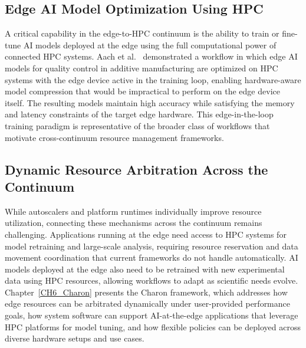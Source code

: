 \subsection{Edge AI Model Optimization Using HPC}

A critical capability in the edge-to-HPC continuum is the ability to train or
fine-tune AI models deployed at the edge using the full computational power of
connected HPC systems.
Aach et al.~\cite{aach2025edgeai} demonstrated a workflow in which edge AI models
for quality control in additive manufacturing are optimized on HPC systems with
the edge device active in the training loop, enabling hardware-aware model
compression that would be impractical to perform on the edge device itself.
The resulting models maintain high accuracy while satisfying the memory and latency
constraints of the target edge hardware.
This edge-in-the-loop training paradigm is representative of the broader class of
workflows that motivate cross-continuum resource management frameworks.

\subsection{Dynamic Resource Arbitration Across the Continuum}

While autoscalers and platform runtimes individually improve resource utilization,
connecting these mechanisms across the continuum remains challenging.
Applications running at the edge need access to HPC systems for model retraining
and large-scale analysis, requiring resource reservation and data movement
coordination that current frameworks do not handle automatically.
AI models deployed at the edge also need to be retrained with new experimental data
using HPC resources, allowing workflows to adapt as scientific needs evolve.
Chapter~\ref{CH6_Charon} presents the Charon framework, which addresses how edge
resources can be arbitrated dynamically under user-provided performance goals, how
system software can support AI-at-the-edge applications that leverage HPC platforms
for model tuning, and how flexible policies can be deployed across diverse hardware
setups and use cases.
